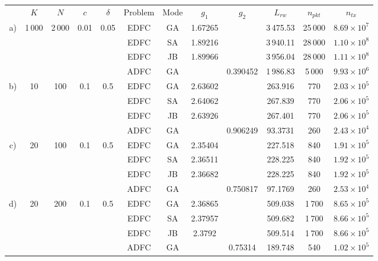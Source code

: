 \renewcommand{\arraystretch}{0.9}
\begin{tabular}{c c c c c c c c c c c c} \toprule
	& $K$ & $N$ & $c$ & $\delta$ &Problem & Mode & $g_1$ & $g_2$ & $L_{rw}$ & $n_{pkt}$ & $n_{tx}$ \\ \cmidrule{2-12}
	\multirow{4}{*}{a)} & \multirow{4}{*}{1\,000} & \multirow{4}{*}{2\,000} & \multirow{4}{*}{0.01} & \multirow{4}{*}{0.05}
															 &EDFC & GA & 1.67265 &  & 3\,475.53 & 25\,000 & $8.69 \times 10^7$ \\
	&&&& &EDFC & SA & 1.89216 &  & 3\,940.11 & 28\,000 & $1.10 \times 10^8$ \\
	&&&& &EDFC & JB & 1.89966 &  & 3\,956.04 & 28\,000 & $1.11 \times 10^8$ \\
	&&&& &ADFC & GA &  & 0.390452 & 1\,986.83 & 5\,000 & $9.93 \times 10^6$ \\ \cmidrule{2-12}
	\multirow{4}{*}{b)} & \multirow{4}{*}{10} & \multirow{4}{*}{100} & \multirow{4}{*}{0.1} & \multirow{4}{*}{0.5}
															 &EDFC & GA & 2.63602 &  & 263.916 & 770 & $2.03 \times 10^5$ \\
	&&&& &EDFC & SA & 2.64062 &  & 267.839 & 770 & $2.06 \times 10^5$ \\
	&&&& &EDFC & JB & 2.63926 &  & 267.401 & 770 & $2.06 \times 10^5$ \\
	&&&& &ADFC & GA &  & 0.906249 & 93.3731 & 260 & $2.43 \times 10^4$ \\ \cmidrule{2-12}
	\multirow{4}{*}{c)} & \multirow{4}{*}{20} & \multirow{4}{*}{100} & \multirow{4}{*}{0.1} & \multirow{4}{*}{0.5}
															 &EDFC & GA & 2.35404 &  & 227.518 & 840 & $1.91 \times 10^5$ \\
	&&&& &EDFC & SA & 2.36511 &  & 228.225 & 840 & $1.92 \times 10^5$ \\
	&&&& &EDFC & JB & 2.36682 &  & 228.225 & 840 & $1.92 \times 10^5$ \\
	&&&& &ADFC & GA &  & 0.750817 & 97.1769 & 260 & $2.53 \times 10^4$ \\ \cmidrule{2-12}
	\multirow{4}{*}{d)} & \multirow{4}{*}{20} & \multirow{4}{*}{200} & \multirow{4}{*}{0.1} & \multirow{4}{*}{0.5}
															 &EDFC & GA & 2.36865 &  & 509.038 & 1\,700 & $8.65 \times 10^5$ \\
	&&&& &EDFC & SA & 2.37957 &  & 509.682 & 1\,700 & $8.66 \times 10^5$ \\
	&&&& &EDFC & JB & 2.3792 &  & 509.514 & 1\,700 & $8.66 \times 10^5$ \\
	&&&& &ADFC & GA &  & 0.75314 & 189.748 & 540 & $1.02 \times 10^5$ \\ \cmidrule{2-12}

\end{tabular}
